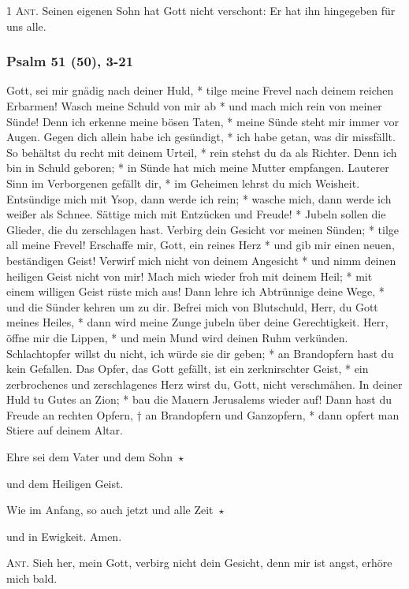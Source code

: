 \noindent \textsc{1 Ant.} Seinen eigenen Sohn hat Gott nicht verschont: Er hat ihn hingegeben für uns alle.

\subsubsection{Psalm 51 (50), 3-21}

Gott, sei mir gnädig nach deiner Huld, * tilge meine Frevel nach deinem reichen Erbarmen!
Wasch meine Schuld von mir ab * und mach mich rein von meiner Sünde!
Denn ich erkenne meine bösen Taten, * meine Sünde steht mir immer vor Augen.
Gegen dich allein habe ich gesündigt, * ich habe getan, was dir missfällt. 
So behältst du recht mit deinem Urteil, * rein stehst du da als Richter.
Denn ich bin in Schuld geboren; * in Sünde hat mich meine Mutter empfangen.
Lauterer Sinn im Verborgenen gefällt dir, * im Geheimen lehrst du mich Weisheit.
Entsündige mich mit Ysop, dann werde ich rein; * wasche mich, dann werde ich weißer als Schnee.
Sättige mich mit Entzücken und Freude! * Jubeln sollen die Glieder, die du zerschlagen hast.
Verbirg dein Gesicht vor meinen Sünden; * tilge all meine Frevel!
Erschaffe mir, Gott, ein reines Herz * und gib mir einen neuen, beständigen Geist!
Verwirf mich nicht von deinem Angesicht * und nimm deinen heiligen Geist nicht von mir!
Mach mich wieder froh mit deinem Heil; * mit einem willigen Geist rüste mich aus!
Dann lehre ich Abtrünnige deine Wege, * und die Sünder kehren um zu dir.
Befrei mich von Blutschuld, Herr, du Gott meines Heiles, * dann wird meine Zunge jubeln über deine Gerechtigkeit.
Herr, öffne mir die Lippen, * und mein Mund wird deinen Ruhm verkünden.
Schlachtopfer willst du nicht, ich würde sie dir geben; * an Brandopfern hast du kein Gefallen.
Das Opfer, das Gott gefällt, ist ein zerknirschter Geist, * ein zerbrochenes und zerschlagenes Herz wirst du, Gott, nicht verschmähen.
In deiner Huld tu Gutes an Zion; * bau die Mauern Jerusalems wieder auf!
Dann hast du Freude an rechten Opfern, † an Brandopfern und Ganzopfern, * dann opfert man Stiere auf deinem Altar.


\noindent Ehre sei dem Vater und dem Sohn~$\star$~\nopagebreak

und dem Heiligen Geist.

\noindent Wie im Anfang, so auch jetzt und alle Zeit~$\star$~\nopagebreak

und in Ewigkeit. Amen.

\vspace{10pt}

\noindent \textsc{Ant.} Sieh her, mein Gott, verbirg nicht dein Gesicht, denn mir ist angst, erhöre mich bald. 

